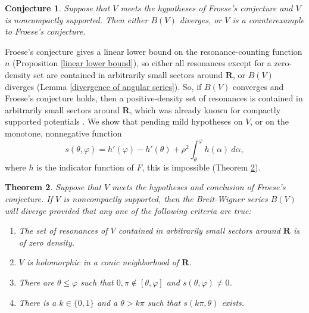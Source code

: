 \documentclass[reqno,12pt,letterpaper]{amsart}
\newcommand{\RR}{\mathbf{R}}
\newtheorem{theorem}{Theorem}[section]
\newtheorem{conjecture}[theorem]{Conjecture}
\theoremstyle{definition}
\begin{document}
\begin{conjecture}
\label{weak conjecture}
Suppose that $V$ meets the hypotheses of Froese's conjecture and $V$ is noncompactly supported. Then either $B(V)$ diverges, or $V$ is a counterexample to Froese's conjecture.
\end{conjecture}
Froese's conjecture gives a linear lower bound on the resonance-counting function $n$ (Proposition \ref{linear lower bound}), so either all resonances except for a zero-density set are contained in arbitrarily small sectors around $\RR$, or $B(V)$ diverges (Lemma \ref{divergence of angular series}).
So, if $B(V)$ converges and Froese's conjecture holds, then a positive-density set of resonances is contained in arbitrarily small sectors around $\RR$, which was already known for compactly supported potentials \cite{zworski1987distribution}.
We show that pending mild hypotheses on $V$, or on the monotone, nonnegative function
\begin{equation}
\label{s formula}
s(\theta, \varphi) = h'(\varphi) - h'(\theta) + \rho^2 \int_\theta^\varphi h(\alpha)~d\alpha,
\end{equation}
where $h$ is the indicator function of $F$, this is impossible (Theorem \ref{divergence of breit wigner, preliminary version}).
\begin{theorem}
\label{divergence of breit wigner, preliminary version}
Suppose that $V$ meets the hypotheses and conclusion of Froese's conjecture. If $V$ is noncompactly supported, then the Breit-Wigner series $B(V)$ will diverge provided that any one of the following criteria are true:
\begin{enumerate}
\item The set of resonances of $V$ contained in arbitrarily small sectors around $\RR$ is of zero density. \label{resonances in sectors}
\item $V$ is holomorphic in a conic neighborhood of $\RR$. \label{holomorphic potential}
\item There are $\theta \leq \varphi$ such that $0,\pi \notin [\theta, \varphi]$ and $s(\theta, \varphi) \neq 0$. \label{s is not defined}
\item There is a $k \in \{0, 1\}$ and a $\theta > k\pi$ such that $s(k\pi, \theta)$ exists. \label{limit of s}
\end{enumerate}
\end{theorem}
\end{document}
